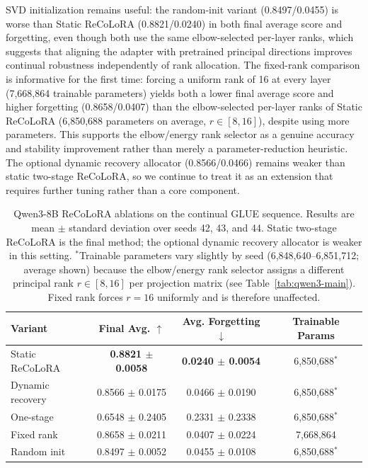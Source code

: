 \documentclass[11pt]{article}
\begin{document}
SVD initialization remains useful: the random-init variant (0.8497/0.0455) is worse than Static ReCoLoRA (0.8821/0.0240) in both final average score and forgetting, even though both use the same elbow-selected per-layer ranks, which suggests that aligning the adapter with pretrained principal directions improves continual robustness independently of rank allocation. The fixed-rank comparison is informative for the first time: forcing a uniform rank of 16 at every layer (7,668,864 trainable parameters) yields both a lower final average score and higher forgetting (0.8658/0.0407) than the elbow-selected per-layer ranks of Static ReCoLoRA (6,850,688 parameters on average, $r\in[8,16]$), despite using more parameters. This supports the elbow/energy rank selector as a genuine accuracy and stability improvement rather than merely a parameter-reduction heuristic. The optional dynamic recovery allocator (0.8566/0.0466) remains weaker than static two-stage ReCoLoRA, so we continue to treat it as an extension that requires further tuning rather than a core component.

\begin{table}[t]
\centering
\begin{tabular}{lccc}
\toprule
Variant & Final Avg. $\uparrow$ & Avg. Forgetting $\downarrow$ & Trainable Params \\
\midrule
Static ReCoLoRA & \textbf{0.8821 $\pm$ 0.0058} & \textbf{0.0240 $\pm$ 0.0054} & 6,850,688$^{*}$ \\
Dynamic recovery & 0.8566 $\pm$ 0.0175 & 0.0466 $\pm$ 0.0190 & 6,850,688$^{*}$ \\
One-stage & 0.6548 $\pm$ 0.2405 & 0.2331 $\pm$ 0.2338 & 6,850,688$^{*}$ \\
Fixed rank & 0.8658 $\pm$ 0.0211 & 0.0407 $\pm$ 0.0224 & 7,668,864 \\
Random init & 0.8497 $\pm$ 0.0052 & 0.0455 $\pm$ 0.0108 & 6,850,688$^{*}$ \\
\bottomrule
\end{tabular}
\caption{Qwen3-8B ReCoLoRA ablations on the continual GLUE sequence. Results are mean $\pm$ standard deviation over seeds 42, 43, and 44. Static two-stage ReCoLoRA is the final method; the optional dynamic recovery allocator is weaker in this setting. $^{*}$Trainable parameters vary slightly by seed (6,848,640--6,851,712; average shown) because the elbow/energy rank selector assigns a different principal rank $r\in[8,16]$ per projection matrix (see Table~\ref{tab:qwen3-main}). Fixed rank forces $r=16$ uniformly and is therefore unaffected.}
\label{tab:qwen3-ablation}
\end{table}
\end{document}
